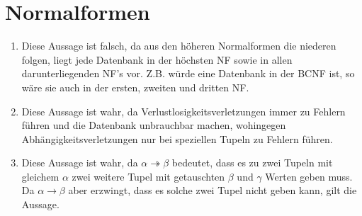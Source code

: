 \documentclass{scrartcl}
\begin{document}
\section{Normalformen}
\begin{enumerate}
    \item Diese Aussage ist falsch, da aus den höheren Normalformen die niederen folgen, liegt jede Datenbank in der höchsten NF sowie in allen darunterliegenden NF's vor. Z.B. würde eine Datenbank in der BCNF ist, so wäre sie auch in der ersten, zweiten und dritten NF.
    \item Diese Aussage ist wahr, da Verlustlosigkeitsverletzungen immer zu Fehlern führen und die Datenbank unbrauchbar machen, wohingegen Abhängigkeitsverletzungen nur bei speziellen Tupeln zu Fehlern führen.
    \item Diese Aussage ist wahr, da $\alpha \twoheadrightarrow \beta$ bedeutet, dass es zu zwei Tupeln mit gleichem $\alpha$ zwei weitere Tupel mit getauschten $\beta$ und $\gamma$ Werten geben muss. Da $\alpha \to \beta$ aber erzwingt, dass es solche zwei Tupel nicht geben kann, gilt die Aussage.
\end{enumerate}
\end{document}
